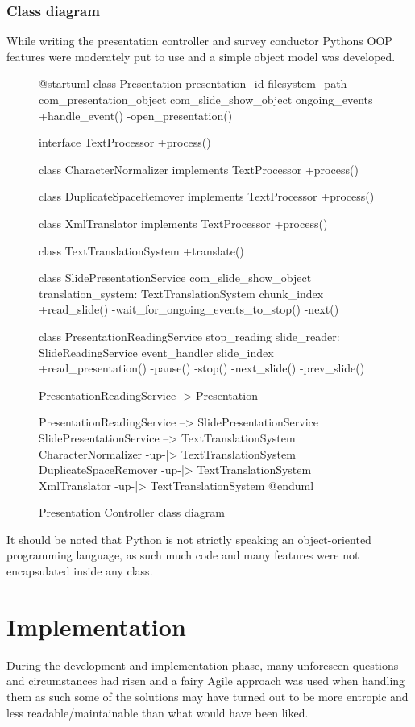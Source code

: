 \documentclass[12pt, fleqn, a4paper]{article}
\begin{document}
\subsubsection{Class diagram}
While writing the presentation controller and survey conductor Pythons OOP features were moderately put to use and a simple object model was developed.
\begin{figure}[H]
	\centering
	\begin{plantuml}
@startuml
class Presentation {
	presentation_id
	filesystem_path
	com_presentation_object
	com_slide_show_object
	ongoing_events
	+handle_event()
	-open_presentation()
}

interface TextProcessor {
	+process()
}

class CharacterNormalizer implements TextProcessor {
	+process()
}

class DuplicateSpaceRemover implements TextProcessor {
	+process()
}

class XmlTranslator implements TextProcessor {
	+process() 
}


class TextTranslationSystem {
	+translate()
}

class SlidePresentationService {
	com_slide_show_object
	translation_system: TextTranslationSystem
	chunk_index
	+read_slide()
	-wait_for_ongoing_events_to_stop()
	-next()
}

class PresentationReadingService {
	stop_reading
	slide_reader: SlideReadingService
	event_handler
	slide_index
	+read_presentation()
	-pause()
	-stop()
	-next_slide()
	-prev_slide()
}

PresentationReadingService -> Presentation

PresentationReadingService --> SlidePresentationService
SlidePresentationService --> TextTranslationSystem
CharacterNormalizer -up-|> TextTranslationSystem
DuplicateSpaceRemover -up-|> TextTranslationSystem
XmlTranslator -up-|> TextTranslationSystem
@enduml
	\end{plantuml}
	\caption{Presentation Controller class diagram}
\end{figure}
It should be noted that Python is not strictly speaking an object-oriented programming language, as such much code and many features were not encapsulated inside any class.
\section{Implementation} %
During the development and implementation phase, many unforeseen questions and circumstances had risen and a fairy Agile approach was used when handling them as such some of the solutions may have turned out to be more entropic and less readable/maintainable than what would have been liked.
\end{document}
